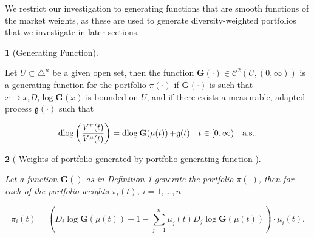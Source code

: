 \documentclass[british]{amsart} \usepackage{lmodern}
\numberwithin{equation}{section} \numberwithin{figure}{section}
\theoremstyle{plain} \newtheorem{thm}{\protect\theoremname}[section]
\theoremstyle{definition} \newtheorem{defn}[thm]{\protect\definitionname}
\theoremstyle{plain} \newtheorem{assumption}[thm]{\protect\assumptionname}
\theoremstyle{plain} \newtheorem{lem}[thm]{\protect\lemmaname}
\theoremstyle{plain} \newtheorem{prop}[thm]{\protect\propositionname}
\theoremstyle{remark} \newtheorem{rem}[thm]{\protect\remarkname}
\theoremstyle{plain} \newtheorem{cor}[thm]{\protect\corollaryname}
\renewcommand{\d}[1]{\mathop{\mathrm{d}{#1}}}
\newcommand{\rangei}{i=1,\dots,n} \newcommand{\measure}{\mathbb{P}}
\begin{document}
We restrict our investigation to generating functions that are smooth functions
of the market weights, as these are used to generate diversity-weighted
portfolios that we investigate in later sections.

\newcommand{\G}[1]{\mathbf{G}(#1)}
\newcommand{\Gmu}{\G{\mu(t)}}
\newcommand{\g}{\mathfrak{g}(t)}

\begin{defn} [Generating Function] 
  \label{def:generatingfunction}

  Let $U \subset \triangle^{n}$ be a given open set, then the function
  $\G{\cdot} \in \mathcal{C}^{2}(U,(0,\infty))$ is a generating function for the
  portfolio $\pi(\cdot)$ if $\G{\cdot}$ is such that $x\to
  x_{i}D_{i}\log\G{x}$ is bounded on $U$, and if there exists a
  measurable, adapted process $\mathfrak{g}(\cdot)$ such that 

  \begin{equation}
    \d{ \log \left( \frac{V^{\pi}(t)}{V^{\mu}(t)} \right) } = 
    \d{\log{\Gmu}} + \g 
    \quad \ranget
    \quad \almostsurely.
  \end{equation}

\end{defn}

\begin{prop} [
  {\cite[Proposition 2.3.2]{vervuurt2015}}
  Weights of portfolio generated by portfolio generating function
  ]
  \label{prop:generatingfunction}

  Let a function $\G{}$ as in Definition \ref{def:generatingfunction}
  generate the portfolio $\pi(\cdot)$, then for each of the portfolio weights
  $\pi_{i}(t)$, $\rangei$

  \begin{equation}
    \label{eq:portfoliogeneratedbyG}
    \pi_{i}(t) = 
      \left( 
        D_{i}\log{\Gmu} + 1 - 
          \sum_{j=1}^{n} \mu_{j}(t) D_{j} \log{\Gmu}
      \right) \cdot \mu_{i}(t).
  \end{equation}

\end{prop}
\end{document}
